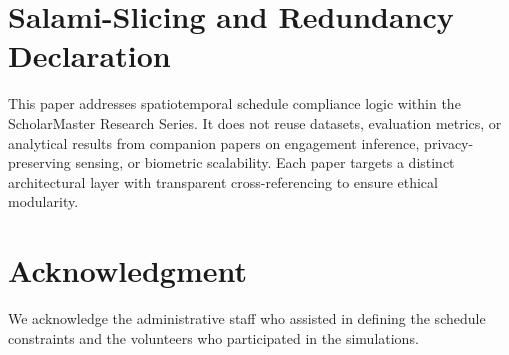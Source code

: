 \documentclass[conference]{IEEEtran}
\begin{document}
\section*{Salami-Slicing and Redundancy Declaration}
This paper addresses spatiotemporal schedule compliance logic within the ScholarMaster Research Series. It does not reuse datasets, evaluation metrics, or analytical results from companion papers on engagement inference, privacy-preserving sensing, or biometric scalability. Each paper targets a distinct architectural layer with transparent cross-referencing to ensure ethical modularity.

\section*{Acknowledgment}
We acknowledge the administrative staff who assisted in defining the schedule constraints and the volunteers who participated in the simulations.
\end{document}

